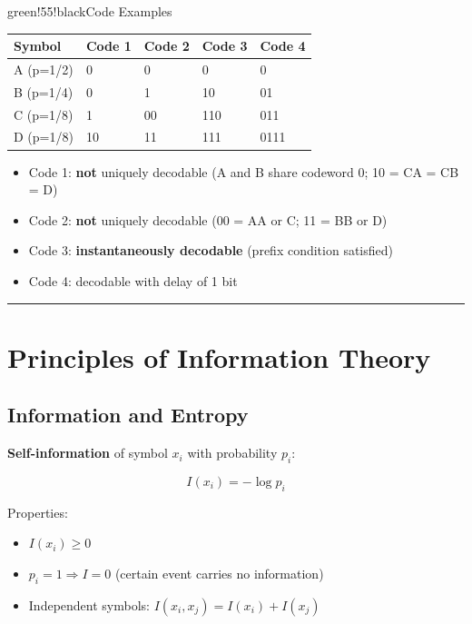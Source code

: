 \begin{calloutbox}{green!55!black}{Code Examples}
\begin{center}
\begin{tabular}{|l|l|l|l|l|}
\hline
\textbf{Symbol} & \textbf{Code 1} & \textbf{Code 2} & \textbf{Code 3} & \textbf{Code 4} \\ \hline
A (p=1/2) & 0 & 0 & 0 & 0 \\ \hline
B (p=1/4) & 0 & 1 & 10 & 01 \\ \hline
C (p=1/8) & 1 & 00 & 110 & 011 \\ \hline
D (p=1/8) & 10 & 11 & 111 & 0111 \\ \hline
\end{tabular}
\end{center}

\begin{itemize}
\item Code 1: \textbf{not} uniquely decodable (A and B share codeword 0; 10 = CA = CB = D)
\item Code 2: \textbf{not} uniquely decodable (00 = AA or C; 11 = BB or D)
\item Code 3: \textbf{instantaneously decodable} (prefix condition satisfied)
\item Code 4: decodable with delay of 1 bit
\end{itemize}
\end{calloutbox}

\bigskip\hrule\bigskip

\section{Principles of Information Theory}

\subsection{Information and Entropy}

\textbf{Self-information} of symbol $x_i$ with probability $p_i$:

\[
I(x_i) = -\log p_i
\]

Properties:
\begin{itemize}
\item $I(x_i) \geq 0$
\item $p_i = 1 \Rightarrow I = 0$ (certain event carries no information)
\item Independent symbols: $I(x_i, x_j) = I(x_i) + I(x_j)$
\end{itemize}

